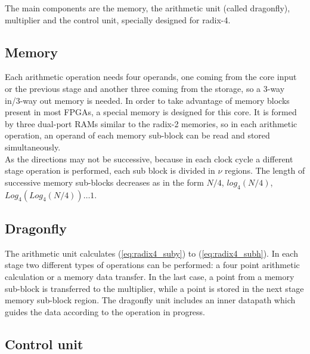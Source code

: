 \documentclass[conference]{IEEEtran}
\begin{document}
The main components are the memory, the arithmetic unit (called dragonfly), multiplier and the control unit, specially designed
for radix-4.

\subsection{Memory}

Each arithmetic operation needs four operands, one coming from the core input or the previous stage and another
three coming from the storage, so a 3-way in/3-way out memory is needed. In order to take advantage of memory blocks present 
in most FPGAs, a special memory is designed for this core. It is formed by three dual-port RAMs similar to the radix-2 memories, so
in each arithmetic operation, an operand of each memory sub-block can be read and stored simultaneously.\\
As the directions may not be successive, because in each clock cycle a different stage operation is performed, each sub block 
is divided in $\nu$ regions. The length of successive memory sub-blocks decreases as in the form $N/4$, $log_4(N/4)$, $Log_4(Log_4(N/4)) \ldots 1$. 
 
\subsection{Dragonfly}

The arithmetic unit calculates (\ref{eq:radix4_suby}) to (\ref{eq:radix4_subh}). In each stage two different 
types of operations can be performed: a four point arithmetic calculation or a memory data transfer.
In the last case, a point from a memory sub-block is transferred to the multiplier, while a point is stored in the next stage memory sub-block region.
The dragonfly unit includes an inner datapath which guides the data according to the operation in progress.
 
\subsection{Control unit}
 
\end{document}
